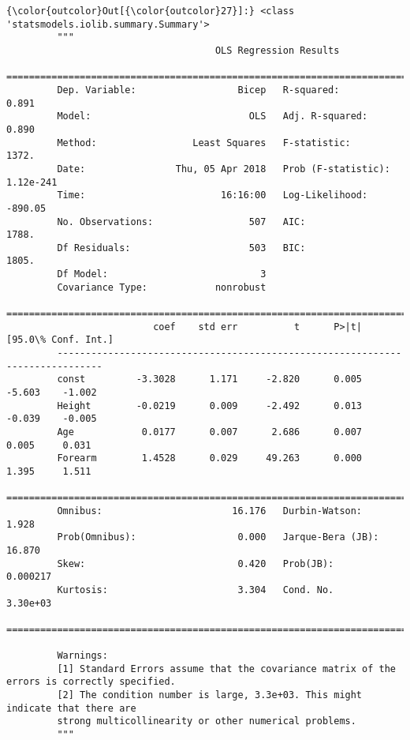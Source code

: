 \documentclass[11pt]{article}
\begin{document}
\begin{Verbatim}[commandchars=\\\{\}]
{\color{outcolor}Out[{\color{outcolor}27}]:} <class 'statsmodels.iolib.summary.Summary'>
         """
                                     OLS Regression Results                            
         ==============================================================================
         Dep. Variable:                  Bicep   R-squared:                       0.891
         Model:                            OLS   Adj. R-squared:                  0.890
         Method:                 Least Squares   F-statistic:                     1372.
         Date:                Thu, 05 Apr 2018   Prob (F-statistic):          1.12e-241
         Time:                        16:16:00   Log-Likelihood:                -890.05
         No. Observations:                 507   AIC:                             1788.
         Df Residuals:                     503   BIC:                             1805.
         Df Model:                           3                                         
         Covariance Type:            nonrobust                                         
         ==============================================================================
                          coef    std err          t      P>|t|      [95.0\% Conf. Int.]
         ------------------------------------------------------------------------------
         const         -3.3028      1.171     -2.820      0.005        -5.603    -1.002
         Height        -0.0219      0.009     -2.492      0.013        -0.039    -0.005
         Age            0.0177      0.007      2.686      0.007         0.005     0.031
         Forearm        1.4528      0.029     49.263      0.000         1.395     1.511
         ==============================================================================
         Omnibus:                       16.176   Durbin-Watson:                   1.928
         Prob(Omnibus):                  0.000   Jarque-Bera (JB):               16.870
         Skew:                           0.420   Prob(JB):                     0.000217
         Kurtosis:                       3.304   Cond. No.                     3.30e+03
         ==============================================================================
         
         Warnings:
         [1] Standard Errors assume that the covariance matrix of the errors is correctly specified.
         [2] The condition number is large, 3.3e+03. This might indicate that there are
         strong multicollinearity or other numerical problems.
         """
\end{Verbatim}
            
\end{document}
